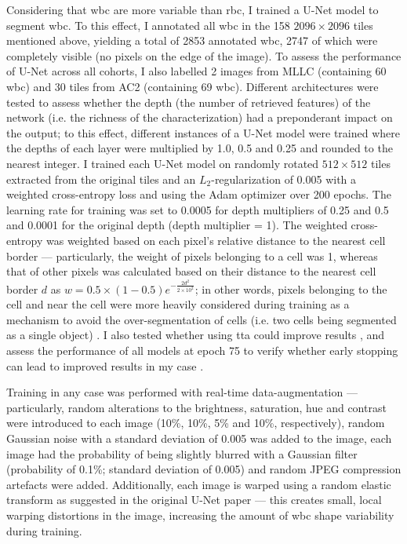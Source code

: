 Considering that \ac{wbc} are more variable than \ac{rbc}, I trained a U-Net model \cite{Ronneberger2015-do} to segment \ac{wbc}. To this effect, I annotated all \ac{wbc} in the 158 $2096 \times 2096$ tiles mentioned above, yielding a total of 2853 annotated \ac{wbc}, 2747 of which were completely visible (no pixels on the edge of the image). To assess the performance of U-Net across all cohorts, I also labelled 2 images from MLLC (containing 60 \ac{wbc}) and 30 tiles from AC2 (containing 69 \ac{wbc}). Different architectures were tested to assess whether the depth (the number of retrieved features) of the network (i.e. the richness of the characterization) had a preponderant impact on the output; to this effect, different instances of a U-Net model were trained where the depths of each layer were multiplied by 1.0, 0.5 and 0.25 and rounded to the nearest integer. I trained each U-Net model on randomly rotated $512 \times 512$ tiles extracted from the original tiles and an $L_2$-regularization of 0.005 with a weighted cross-entropy loss and using the Adam optimizer \cite{Kingma2014-zd} over 200 epochs. The learning rate for training was set to 0.0005 for depth multipliers of 0.25 and 0.5 and 0.0001 for the original depth (depth multiplier = 1). The weighted cross-entropy was weighted based on each pixel's relative distance to the nearest cell border --- particularly, the weight of pixels belonging to a cell was 1, whereas that of other pixels was calculated based on their distance to the nearest cell border $d$ as $w = 0.5 \times (1-0.5)e^{-\frac{2d^2}{2 \times 10^2}}$; in other words, pixels belonging to the cell and near the cell were more heavily considered during training as a mechanism to avoid the over-segmentation of cells (i.e. two cells being segmented as a single object) \cite{Ronneberger2015-do}. I also tested whether using \ac{tta} could improve results \cite{Moshkov2020-rc}, and assess the performance of all models at epoch 75 to verify whether early stopping can lead to improved results in my case \cite{Prechelt2012-xf}. 

Training in any case was performed with real-time data-augmentation --- particularly, random alterations to the brightness, saturation, hue and contrast were introduced to each image (10\%, 10\%, 5\% and 10\%, respectively), random Gaussian noise with a standard deviation of 0.005 was added to the image, each image had the probability of being slightly blurred with a Gaussian filter (probability of 0.1\%; standard deviation of 0.005) and random JPEG compression artefacts were added. Additionally, each image is warped using a random elastic transform as suggested in the original U-Net paper \cite{Ronneberger2015-do} --- this creates small, local warping distortions in the image, increasing the amount of \ac{wbc} shape variability during training. 

